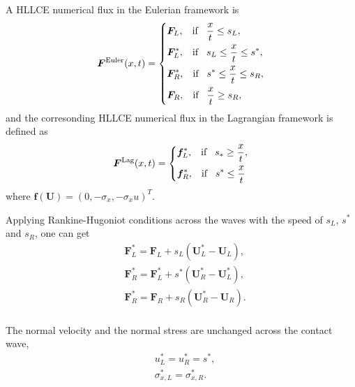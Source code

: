 \documentclass{article}
\theoremstyle{plain}\newtheorem{definition}{\sc{Definition}}
\theoremstyle{defination}\newtheorem{example}{Example}[section]
\numberwithin{equation}{section}
\numberwithin{table}{section}
\begin{document}
A HLLCE numerical flux in the Eulerian framework is 
  \begin{equation}
	\bm{F}^{\text{Euler}}(x,t) = \left\{ \begin{aligned}
		& \bm{F}_L, \hspace{0.3cm} \text{if} \hspace{0.3cm} \frac{x}{t}\le s_L, \\
		& \bm{F}_L^*, \hspace{0.3cm} \text{if} \hspace{0.3cm} s_L\le \frac{x}{t} \le s^*, \\
		& \bm{F}_R^*, \hspace{0.3cm} \text{if} \hspace{0.3cm} s^*\le \frac{x}{t} \le s_R,\\
		& \bm{F}_R, \hspace{0.3cm} \text{if} \hspace{0.3cm} \frac{x}{t}\ge s_R, \\
	  \end{aligned}
	\right.
  \end{equation}
   and the corresonding HLLCE numerical flux in the Lagrangian framework is defined as
\begin{equation}
	\bm{F}^{\text{Lag}}(x,t) = \left\{ \begin{aligned}
		& \bm{f}_L^*, \hspace{0.3cm} \text{if} \hspace{0.3cm} s_*\ge \frac{x}{t},\\
		& \bm{f}_R^*, \hspace{0.3cm} \text{if} \hspace{0.3cm} s^*\le \frac{x}{t}\\
	  \end{aligned}
	\right.
  \end{equation}
  where $\bm{f}(\bm{U}) = (0, -\sigma_x, -\sigma_x u)^T$.

  Applying Rankine-Hugoniot conditions across the waves  with the speed of $s_L$, $s^*$ and $s_R$, one can  get 
	\begin{align}
	  &\bm{F}_L^* = \bm{F}_L+s_L (\bm{U}_L^*-\bm{U}_L),\\ \label{eq:RH1}
	&\bm{F}_R^* = \bm{F}_L^*+s^*(\bm{U}_R^*-\bm{U}_L^*),\\
	&\bm{F}_R^* = \bm{F}_R+s_R(\bm{U}_R^*-\bm{U}_R).\\
  \end{align}

  The normal velocity and the normal stress  are unchanged across the contact wave,
	\begin{align}
	  & u_L^* = u_R^* =s^*,\\
	  & \sigma_{x,L}^* = \sigma_{x,R}^* .\\
	\end{align}
\end{document}

